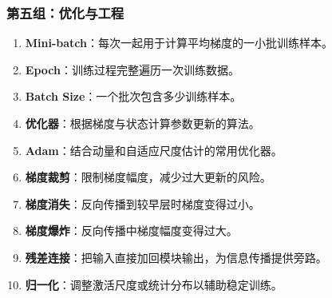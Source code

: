 \subsubsection{第五组：优化与工程}
\begin{enumerate}[leftmargin=2.5em,itemsep=4pt,start=41]
\item \textbf{Mini-batch}：每次一起用于计算平均梯度的一小批训练样本。 
\item \textbf{Epoch}：训练过程完整遍历一次训练数据。 
\item \textbf{Batch Size}：一个批次包含多少训练样本。 
\item \textbf{优化器}：根据梯度与状态计算参数更新的算法。 
\item \textbf{Adam}：结合动量和自适应尺度估计的常用优化器。 
\item \textbf{梯度裁剪}：限制梯度幅度，减少过大更新的风险。 
\item \textbf{梯度消失}：反向传播到较早层时梯度变得过小。 
\item \textbf{梯度爆炸}：反向传播中梯度幅度变得过大。 
\item \textbf{残差连接}：把输入直接加回模块输出，为信息传播提供旁路。 
\item \textbf{归一化}：调整激活尺度或统计分布以辅助稳定训练。 
\end{enumerate}

